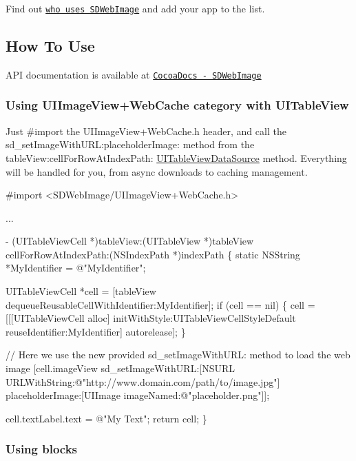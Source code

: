 Find out \href{https://github.com/rs/SDWebImage/wiki/Who-Uses-SDWebImage}{\tt who uses S\+D\+Web\+Image} and add your app to the list.

\subsection*{How To Use }

A\+PI documentation is available at \href{http://cocoadocs.org/docsets/SDWebImage/}{\tt Cocoa\+Docs -\/ S\+D\+Web\+Image}

\subsubsection*{Using U\+I\+Image\+View+\+Web\+Cache category with U\+I\+Table\+View}

Just \#import the U\+I\+Image\+View+\+Web\+Cache.h header, and call the sd\+\_\+set\+Image\+With\+U\+R\+L\+:placeholder\+Image\+: method from the table\+View\+:cell\+For\+Row\+At\+Index\+Path\+: \mbox{\hyperlink{class_u_i_table_view_data_source-p}{U\+I\+Table\+View\+Data\+Source}} method. Everything will be handled for you, from async downloads to caching management.


\begin{DoxyCode}
#import <SDWebImage/UIImageView+WebCache.h>

...

- (UITableViewCell *)tableView:(UITableView *)tableView cellForRowAtIndexPath:(NSIndexPath *)indexPath \{
    static NSString *MyIdentifier = @"MyIdentifier";

    UITableViewCell *cell = [tableView dequeueReusableCellWithIdentifier:MyIdentifier];
    if (cell == nil) \{
        cell = [[[UITableViewCell alloc] initWithStyle:UITableViewCellStyleDefault
                                       reuseIdentifier:MyIdentifier] autorelease];
    \}

    // Here we use the new provided sd\_setImageWithURL: method to load the web image
    [cell.imageView sd\_setImageWithURL:[NSURL URLWithString:@"http://www.domain.com/path/to/image.jpg"]
                      placeholderImage:[UIImage imageNamed:@"placeholder.png"]];

    cell.textLabel.text = @"My Text";
    return cell;
\}
\end{DoxyCode}


\subsubsection*{Using blocks}

